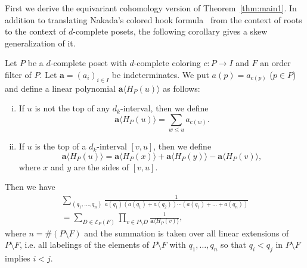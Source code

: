 \documentclass[ALCO,ThmDefs,Unicode,epreuves]{cedram}
\newcommand\vecta{\boldsymbol{a}}
\newcommand\EE{\mathcal{E}}
\begin{document}
First we derive the equivariant cohomology version of Theorem~\ref{thm:main1}.
In addition to translating Nakada's colored hook formula~\cite[Corollary~7.2]{N1} 
from the context of roots to the context of $d$-complete posets, 
the following corollary gives a skew generalization of it.

\begin{coro}
\label{cor:main2}
Let $P$ be a $d$-complete poset with $d$-complete coloring $c : P \to I$ 
and $F$ an order filter of $P$.
Let $\vecta = (a_i)_{i \in I}$ be indeterminates.
We put $a(p) = a_{c(p)}$ \textup{(}$p \in P$\textup{)} 
and define a linear polynomial $\vecta \langle H_P(u) \rangle$ 
as follows:
\begin{enumerate}[(i)]
\item\label{coro5.4_i} %
If $u$ is not the top of any $d_k$-interval, then we define
$$
\vecta \langle H_P(u) \rangle = \sum_{w \le u} a_{c(w)}.
$$
\item\label{coro5.4_ii} %
If $u$ is the top of a $d_k$-interval $[v,u]$, then we define
$$
\vecta \langle H_P(u) \rangle
 =
\vecta \langle H_P(x) \rangle + \vecta \langle H_P(y) \rangle
- \vecta \langle H_P(v) \rangle,
$$
where $x$ and $y$ are the sides of $[v,u]$.
\end{enumerate}
Then we have
\begin{multline}
\label{eq:main2}
\sum_{(q_1, \dots, q_n)}
 \frac{ 1 }
 { a(q_1) (a(q_1)+a(q_2)) \cdots (a(q_1)+\dots+a(q_n)) }
\\
 =
\sum_{D \in \EE_P(F)}
 \prod_{v \in P \setminus D}
 \frac{ 1 }
 { \vecta \langle H_P(v) \rangle },
\end{multline}
where $n = \# (P\setminus F)$ and 
the summation is taken over all linear extensions of $P \setminus F$, 
i.e. all labelings of the elements of $P \setminus F$ with $q_1, \dots, q_n$ so that 
 $q_i < q_j$ in $P \setminus F$ implies $i < j$.
\end{coro}
\end{document}
